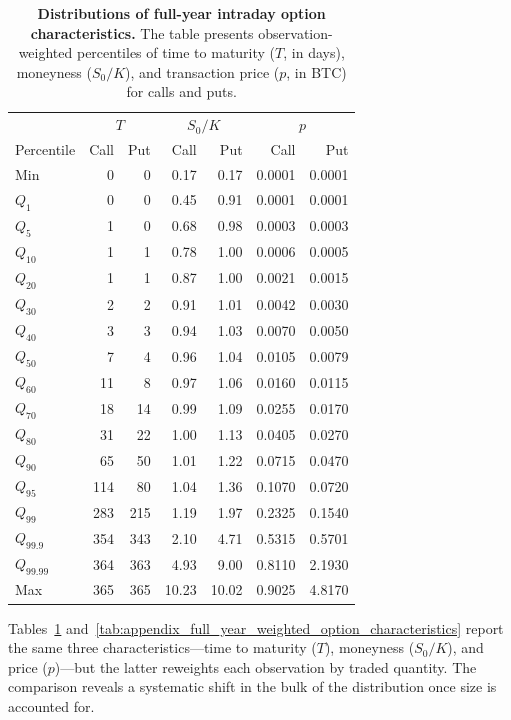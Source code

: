 \documentclass[11pt]{article}
\begin{document}
\begin{table}[h]
\centering
\begin{tabular}{lrrrrrr}
\hline
 & \multicolumn{2}{c}{$T$} & \multicolumn{2}{c}{$S_0/K$} & \multicolumn{2}{c}{$p$} \\
 Percentile & Call & Put & Call & Put & Call & Put \\
\hline
Min & 0 & 0 & 0.17 & 0.17 & 0.0001 & 0.0001 \\
$Q_1$ & 0 & 0 & 0.45 & 0.91 & 0.0001 & 0.0001 \\
$Q_5$ & 1 & 0 & 0.68 & 0.98 & 0.0003 & 0.0003 \\
$Q_{10}$ & 1 & 1 & 0.78 & 1.00 & 0.0006 & 0.0005 \\
$Q_{20}$ & 1 & 1 & 0.87 & 1.00 & 0.0021 & 0.0015 \\
$Q_{30}$ & 2 & 2 & 0.91 & 1.01 & 0.0042 & 0.0030 \\
$Q_{40}$ & 3 & 3 & 0.94 & 1.03 & 0.0070 & 0.0050 \\
$Q_{50}$ & 7 & 4 & 0.96 & 1.04 & 0.0105 & 0.0079 \\
$Q_{60}$ & 11 & 8 & 0.97 & 1.06 & 0.0160 & 0.0115 \\
$Q_{70}$ & 18 & 14 & 0.99 & 1.09 & 0.0255 & 0.0170 \\
$Q_{80}$ & 31 & 22 & 1.00 & 1.13 & 0.0405 & 0.0270 \\
$Q_{90}$ & 65 & 50 & 1.01 & 1.22 & 0.0715 & 0.0470 \\
$Q_{95}$ & 114 & 80 & 1.04 & 1.36 & 0.1070 & 0.0720 \\
$Q_{99}$ & 283 & 215 & 1.19 & 1.97 & 0.2325 & 0.1540 \\
$Q_{99.9}$ & 354 & 343 & 2.10 & 4.71 & 0.5315 & 0.5701 \\
$Q_{99.99}$ & 364 & 363 & 4.93 & 9.00 & 0.8110 & 2.1930 \\
Max & 365 & 365 & 10.23 & 10.02 & 0.9025 & 4.8170 \\
\hline
\end{tabular}
\caption{\textbf{Distributions of full-year intraday option characteristics.} The table presents observation-weighted percentiles of time to maturity ($T$, in days), moneyness ($S_0/K$), and transaction price ($p$, in BTC) for calls and puts.}
\label{tab:appendix_full_year_option_characteristics}
\end{table}

Tables~\ref{tab:appendix_full_year_option_characteristics} and~\ref{tab:appendix_full_year_weighted_option_characteristics} report the same three characteristics---time to maturity ($T$), moneyness ($S_0/K$), and price ($p$)---but the latter reweights each observation by traded quantity. The comparison reveals a systematic shift in the bulk of the distribution once size is accounted for.
\end{document}
